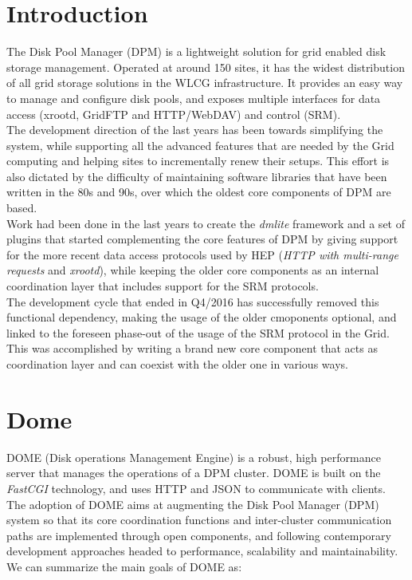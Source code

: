 \documentclass[a4paper]{jpconf}
\begin{document}
\section{Introduction}
The Disk Pool Manager (DPM) is a lightweight solution for grid enabled disk storage
management. Operated at around 150 sites, it has the widest distribution of all grid storage
solutions in the WLCG infrastructure. It provides an easy way to manage and configure disk
pools, and exposes multiple interfaces for data access (xrootd, GridFTP and HTTP/WebDAV)
and control (SRM).\\
The development direction of the last years has been towards simplifying the
system, while supporting all the advanced features that are needed by the Grid computing and
helping sites to incrementally renew their setups.
This effort is also dictated by the difficulty of maintaining software libraries that have been
written in the 80s and 90s, over which the oldest core components of DPM are based.\\
Work had been done in the last years to create the \textit{dmlite} \cite{BIB} framework and a set of plugins
that started complementing the core features of DPM by giving support for the more recent
data access protocols used by HEP (\textit{HTTP with multi-range requests} and \textit{xrootd}),
while keeping the older core components as an internal coordination layer that includes
support for the SRM protocols.\\
The development cycle that ended in Q4/2016 has successfully removed this functional
dependency, making the usage of the older cmoponents optional, and linked to the
foreseen phase-out of the usage of the SRM protocol in the Grid. This was accomplished by
writing a brand new core component that acts as coordination layer and can coexist with the
older one in various ways.


\section{Dome}

DOME (Disk operations Management Engine) is a robust, high performance server that manages the operations of a DPM cluster. DOME is built on the \textit{FastCGI} \cite{BIB} technology,
and uses HTTP and JSON to communicate with clients.
The adoption of DOME aims at augmenting the Disk Pool Manager (DPM) system so that its core coordination functions and inter-cluster communication paths are
implemented through open components, and following contemporary development approaches headed to performance, scalability and maintainability. We can summarize the
main goals of DOME as:
\end{document}
